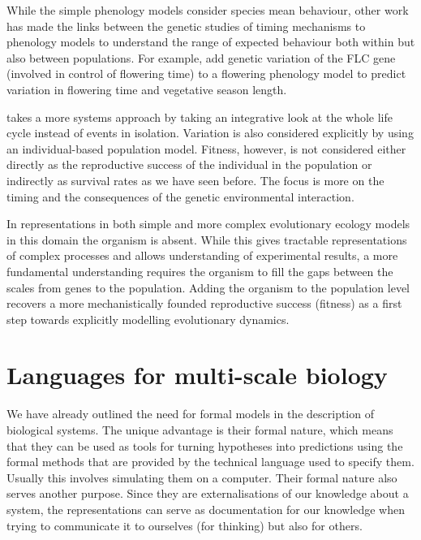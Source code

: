 While the simple phenology models consider species mean behaviour, other work
has made the links between the genetic studies of timing mechanisms to phenology
models to understand the range of expected behaviour both within but also
between populations. For example, \citet{wilczek_effects_2009} add genetic
variation of the FLC gene (involved in control of flowering time) to a flowering
phenology model to predict variation in flowering time and vegetative season
length.

\citet{burghardt_modeling_2015} takes a more systems approach by taking an
integrative look at the whole life cycle instead of events in
isolation. Variation is also considered explicitly by using an individual-based
population model. Fitness, however, is not considered either directly as the
reproductive success of the individual in the population or indirectly as
survival rates as we have seen before. The focus is more on the timing and the
consequences of the genetic environmental interaction.

In representations in both simple and more complex evolutionary ecology models
in this domain the organism is absent. While this gives tractable
representations of complex processes and allows understanding of experimental
results, a more fundamental understanding requires the organism to fill the gaps
between the scales from genes to the population. Adding the organism to the
population level recovers a more mechanistically founded reproductive success
(fitness) as a first step towards explicitly modelling evolutionary dynamics.



\section{Languages for multi-scale biology}
We have already outlined the need for formal models in the description of
biological systems. The unique advantage is their formal nature, which means
that they can be used as tools for turning hypotheses into predictions using the
formal methods that are provided by the technical language used to specify
them. Usually this involves simulating them on a computer. Their formal nature
also serves another purpose. Since they are externalisations of our knowledge
about a system, the representations can serve as documentation for our knowledge
when trying to communicate it to ourselves (for thinking) but also for others.

